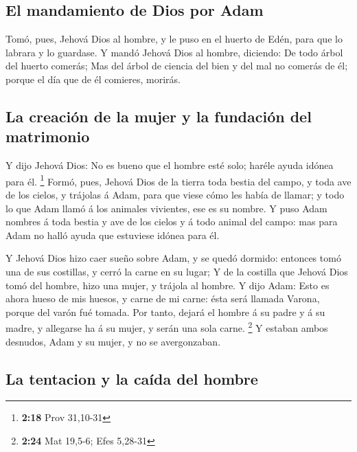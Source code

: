 \hypertarget{el-mandamiento-de-dios-por-adam}{%
\subsection{El mandamiento de Dios por
Adam}\label{el-mandamiento-de-dios-por-adam}}

 Tomó, pues, Jehová Dios al hombre, y le puso en el huerto
de Edén, para que lo labrara y lo guardase.  Y mandó Jehová
Dios al hombre, diciendo: De todo árbol del huerto comerás;
 Mas del árbol de ciencia del bien y del mal no comerás de
él; porque el día que de él comieres, morirás.

\hypertarget{la-creaciuxf3n-de-la-mujer-y-la-fundaciuxf3n-del-matrimonio}{%
\subsection{La creación de la mujer y la fundación del
matrimonio}\label{la-creaciuxf3n-de-la-mujer-y-la-fundaciuxf3n-del-matrimonio}}

 Y dijo Jehová Dios: No es bueno que el hombre esté solo;
haréle ayuda idónea para él. \footnote{\textbf{2:18} Prov 31,10-31}
 Formó, pues, Jehová Dios de la tierra toda bestia del
campo, y toda ave de los cielos, y trájolas á Adam, para que viese cómo
les había de llamar; y todo lo que Adam llamó á los animales vivientes,
ese es su nombre.  Y puso Adam nombres á toda bestia y ave
de los cielos y á todo animal del campo: mas para Adam no halló ayuda
que estuviese idónea para él.

 Y Jehová Dios hizo caer sueño sobre Adam, y se quedó
dormido: entonces tomó una de sus costillas, y cerró la carne en su
lugar;  Y de la costilla que Jehová Dios tomó del hombre,
hizo una mujer, y trájola al hombre.  Y dijo Adam: Esto es
ahora hueso de mis huesos, y carne de mi carne: ésta será llamada
Varona, porque del varón fué tomada.  Por tanto, dejará el
hombre á su padre y á su madre, y allegarse ha á su mujer, y serán una
sola carne. \footnote{\textbf{2:24} Mat 19,5-6; Efes 5,28-31}
 Y estaban ambos desnudos, Adam y su mujer, y no se
avergonzaban.

\hypertarget{la-tentacion-y-la-cauxedda-del-hombre}{%
\subsection{La tentacion y la caída del
hombre}\label{la-tentacion-y-la-cauxedda-del-hombre}}

